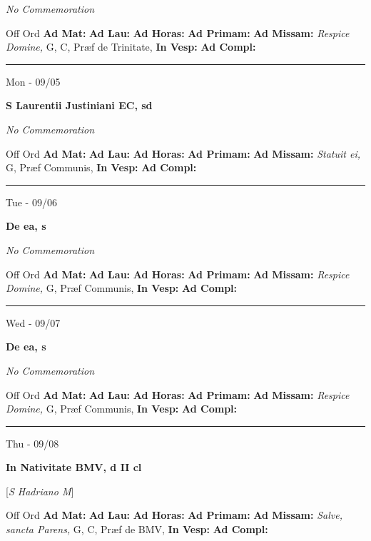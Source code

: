 \documentclass[letterpaper, 10pt]{article}
\begin{document}
\textit{No Commemoration}\begin{justify}
Off Ord
\textbf{Ad Mat: }
\textbf{Ad Lau: }
\textbf{Ad Horas: }
\textbf{Ad Primam: }
\textbf{Ad Missam:} \textit{Respice Domine, } G, C, Præf de Trinitate, 
\textbf{In Vesp: }
\textbf{Ad Compl: }\end{justify}



\hrule
\begin{center}
Mon - 09/05
\end{center}\textbf{ \large S Laurentii Justiniani EC, \textnormal{\normalsize sd}}

\textit{No Commemoration}\begin{justify}
Off Ord
\textbf{Ad Mat: }
\textbf{Ad Lau: }
\textbf{Ad Horas: }
\textbf{Ad Primam: }
\textbf{Ad Missam:} \textit{Statuit ei, } G, Præf Communis, 
\textbf{In Vesp: }
\textbf{Ad Compl: }\end{justify}



\hrule
\begin{center}
Tue - 09/06
\end{center}\textbf{ \large De ea, \textnormal{\normalsize s}}

\textit{No Commemoration}\begin{justify}
Off Ord
\textbf{Ad Mat: }
\textbf{Ad Lau: }
\textbf{Ad Horas: }
\textbf{Ad Primam: }
\textbf{Ad Missam:} \textit{Respice Domine, } G, Præf Communis, 
\textbf{In Vesp: }
\textbf{Ad Compl: }\end{justify}



\hrule
\begin{center}
Wed - 09/07
\end{center}\textbf{ \large De ea, \textnormal{\normalsize s}}

\textit{No Commemoration}\begin{justify}
Off Ord
\textbf{Ad Mat: }
\textbf{Ad Lau: }
\textbf{Ad Horas: }
\textbf{Ad Primam: }
\textbf{Ad Missam:} \textit{Respice Domine, } G, Præf Communis, 
\textbf{In Vesp: }
\textbf{Ad Compl: }\end{justify}



\hrule
\begin{center}
Thu - 09/08
\end{center}\textbf{ \large In Nativitate BMV, \textnormal{\normalsize d II cl}}

[\textit{S Hadriano M}]
\begin{justify}
Off Ord
\textbf{Ad Mat: }
\textbf{Ad Lau: }
\textbf{Ad Horas: }
\textbf{Ad Primam: }
\textbf{Ad Missam:} \textit{Salve, sancta Parens, } G, C, Præf de BMV, 
\textbf{In Vesp: }
\textbf{Ad Compl: }\end{justify}
\end{document}
